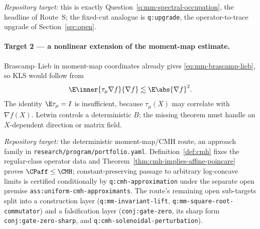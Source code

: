 \documentclass[../../main.tex]{subfiles}
\begin{document}
\emph{Repository target:} this is exactly Question~\ref{q:mm-spectral-occupation}, the headline of
Route~S; the fixed-cut analogue is \texttt{q:upgrade}, the operator-to-trace upgrade of
Section~\ref{sec:open}.

\paragraph{Target 2 --- a nonlinear extension of the moment-map estimate.}
Brascamp--Lieb in moment-map coordinates already gives \eqref{eq:mm-brascamp-lieb}, so KLS would
follow from
\begin{equation}
  \E\inner{\tau_\mu\nabla f}{\nabla f}\lesssim\E\abs{\nabla f}^2 .
  \label{eq:nonlinear-moment-map}
\end{equation}
The identity $\E\tau_\mu=I$ is insufficient, because $\tau_\mu(X)$ may correlate with
$\nabla f(X)$. Letwin controls a deterministic $B$; the missing theorem must handle an
$X$-dependent direction or matrix field.

\emph{Repository target:} the deterministic moment-map/CMH route, an approach family in
\texttt{research/program/portfolio.yaml}. Definition~\ref{def:cmh} fixes the regular-class operator data
and Theorem~\ref{thm:cmh-implies-affine-poincare} proves $\CPaff\le\CMH$; constant-preserving
passage to arbitrary log-concave limits is certified conditionally by
\texttt{q:cmh-approximation} under the separate open premise
\texttt{ass:uniform-cmh-approximants}. The route's remaining open sub-targets split into a
construction layer (\texttt{q:mm-invariant-lift}, \texttt{q:mm-square-root-commutator}) and a
falsification layer (\texttt{conj:gate-zero}, its sharp form \texttt{conj:gate-zero-sharp}, and
\texttt{q:cmh-solenoidal-perturbation}).
\end{document}
